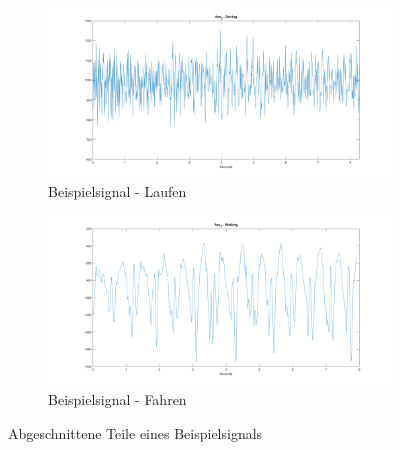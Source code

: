 \begin{figure}
	\centering
	\begin{subfigure}{\textwidth} %
		\centering
		\includegraphics[width=\textwidth]{Bilder/AccZ_Driving_8Sec.png}
		\caption{Beispielsignal - Laufen}
		\label{fig:AccZ_Driving_8Sec}
	\end{subfigure}
	\hfill
	\begin{subfigure}{\textwidth}
		\centering
		\includegraphics[width=\textwidth]{Bilder/AccZ_Walking_8Sec.png} 
		\caption{Beispielsignal - Fahren}
		\label{fig:AccZ_Walking_8Sec}
	\end{subfigure}
	\caption{Abgeschnittene Teile eines Beispielsignals}
	\label{fig:AbschnitteBeispielsignal}
\end{figure}



